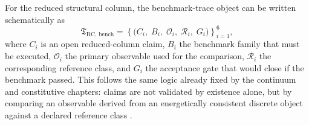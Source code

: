 For the reduced structural column, the benchmark-trace object can be written
schematically as
\begin{equation}
  \mathfrak{T}_{\mathrm{RC},\,\mathrm{bench}}
  =
  \left\{
    \bigl(C_i,\;B_i,\;\mathcal{O}_i,\;\mathcal{R}_i,\;G_i\bigr)
  \right\}_{i=1}^{6},
\end{equation}
where \(C_i\) is an open reduced-column claim, \(B_i\) the benchmark family
that must be executed, \(\mathcal{O}_i\) the primary observable used for the
comparison, \(\mathcal{R}_i\) the corresponding reference class, and \(G_i\)
the acceptance gate that would close if the benchmark passed.  This follows
the same logic already fixed by the continuum and constitutive chapters:
claims are not validated by existence alone, but by comparing an observable
derived from an energetically consistent discrete object against a declared
reference class \cite{Crisfield1991_NLFEA_Vol1,DeBorst2012_NonlinearFEM}.

